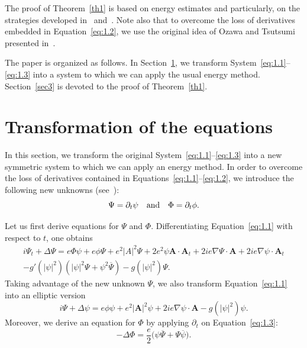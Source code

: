 \documentclass[AHL,Unicode,longabstracts]{cedram}
\newcommand{\BA}{\mathbf{A}}
\begin{document}
The proof of Theorem~\ref{th1} is based on energy estimates and particularly, on the strategies developed in~\cite{Co1} and~\cite{CC}. Note also that to overcome the loss of derivatives embedded in Equation~\eqref{eq:1.2}, we use the original idea of Ozawa and Tsutsumi presented in~\cite{OT}.

The paper is organized as follows. In Section~\ref{sec2}, we transform System~\eqref{eq:1.1}--\eqref{eq:1.3} into a system to which we can apply the usual energy method. Section~\ref{sec3} is devoted to the proof of Theorem~\ref{th1}.



\section{Transformation of the equations}\label{sec2}

In this section, we transform the original System~\eqref{eq:1.1}--\eqref{eq:1.3} into a new symmetric system to which we can apply an energy method. In order to overcome the loss of derivatives contained in Equations~\eqref{eq:1.1}--\eqref{eq:1.2}, we introduce the following new unknowns (see~\cite{OT}):
\[
\Psi=\partial_t \psi \quad \hbox{and} \quad \Phi=\partial_t \phi.
\]

Let us first derive equations for $\Psi$ and $\Phi$. Differentiating Equation~\eqref{eq:1.1} with respect to $t$, one obtains
\begin{multline*}
i\Psi_t +\Delta \Psi = e \Phi \psi +e \phi \Psi +e^2 |A|^2 \Psi+ 2e^2 \psi \BA \cdot \BA_t +2i e \nabla \Psi \cdot \BA +2i e \nabla \psi \cdot \BA_t \\
-g'(|\psi|^2)(|\psi|^2\Psi+\psi^2\overline{\Psi})-g(|\psi|^2)\Psi.
\end{multline*}
Taking advantage of the new unknown $\Psi$, we also transform Equation~\eqref{eq:1.1} into an elliptic version
\begin{equation*}
i\Psi +\Delta \psi = e\phi \psi +e^2 |\BA|^2 \psi + 2 ie \nabla \psi\cdot \BA -g(|\psi|^2)\psi.
\end{equation*}
Moreover, we derive an equation for $\Phi$ by applying $\partial_t$ on Equation~\eqref{eq:1.3}:
\begin{equation*}
-\Delta \Phi =\frac{e}{2} \big(\psi \overline{\Psi}+\Psi \overline{\psi}\big).
\end{equation*}
\end{document}
